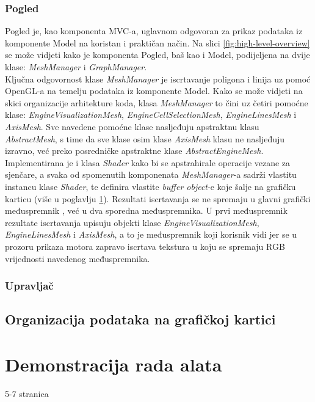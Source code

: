 \documentclass[times, utf8, diplomski]{fer}
\begin{document}
\subsection{Pogled}

Pogled je, kao komponenta MVC-a, uglavnom odgovoran za prikaz podataka iz komponente Model na koristan i praktičan način. Na slici \ref{fig:high-level-overview} se može vidjeti kako je komponenta Pogled, baš kao i Model, podijeljena na dvije klase: \textit{MeshManager} i \textit{GraphManager}.\\

Ključna odgovornost klase \textit{MeshManager} je iscrtavanje poligona i linija uz pomoć OpenGL-a na temelju podataka iz komponente Model. Kako se može vidjeti na skici organizacije arhitekture koda, klasa \textit{MeshManager} to čini uz četiri pomoćne klase: \textit{EngineVisualizationMesh}, \textit{EngineCellSelectionMesh}, \textit{EngineLinesMesh} i \textit{AxisMesh}. Sve navedene pomoćne klase nasljeđuju apstraktnu klasu \textit{AbstractMesh}, s time da sve klase osim klase \textit{AxisMesh} klasu ne nasljeđuju izravno, već preko posredničke apstraktne klase \textit{AbstractEngineMesh}.
Implementirana je i klasa \textit{Shader} kako bi se apstrahirale operacije vezane za sjenčare, a svaka od spomenutih komponenata \textit{MeshManager}-a sadrži vlastitu instancu klase \textit{Shader}, te definira vlastite \textit{buffer object}-e koje šalje na grafičku karticu (više u poglavlju \ref{graphics-card-data-section}).  Rezultati iscrtavanja se ne spremaju u glavni grafički međuspremnik , već u dva sporedna međuspremnika. U prvi međuspremnik rezultate iscrtavanja upisuju objekti klase \textit{EngineVisualizationMesh}, \textit{EngineLinesMesh} i \textit{AxisMesh}, a to je međuspremnik koji korisnik vidi jer se u prozoru prikaza motora zapravo iscrtava tekstura u koju se spremaju RGB vrijednosti navedenog međuspremnika. 

\subsection{Upravljač}

\section{Organizacija podataka na grafičkoj kartici} \label{graphics-card-data-section}

\chapter{Demonstracija rada alata}
5-7 stranica
\end{document}
